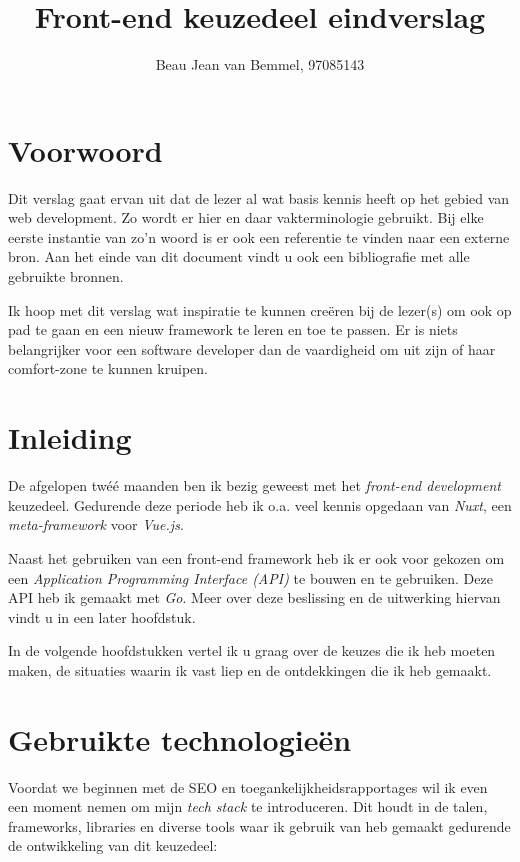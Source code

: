 \documentclass[a4paper]{report}
\title{Front-end keuzedeel eindverslag}
\author{Beau Jean van Bemmel, 97085143}
\begin{document}
    \maketitle

    \chapter*{Voorwoord}
    Dit verslag gaat ervan uit dat de lezer al wat basis kennis heeft op het gebied van web development.
    Zo wordt er hier en daar vakterminologie gebruikt. Bij elke eerste instantie van zo'n woord is er ook een referentie te vinden naar een externe bron.
    Aan het einde van dit document vindt u ook een bibliografie met alle gebruikte bronnen.

    Ik hoop met dit verslag wat inspiratie te kunnen creëren bij de lezer(s) om ook op pad te gaan en een nieuw framework te leren en toe te passen.
    Er is niets belangrijker voor een software developer dan de vaardigheid om uit zijn of haar comfort-zone te kunnen kruipen.
    \tableofcontents

    \chapter{Inleiding}
    De afgelopen twéé maanden ben ik bezig geweest met het \textit{front-end development} keuzedeel.
    Gedurende deze periode heb ik o.a. veel kennis opgedaan van 
    \textit{Nuxt}, een 
    \textit{meta-framework} voor 
    \textit{Vue.js}.
    
    Naast het gebruiken van een front-end framework heb ik er ook voor gekozen om een \textit{Application Programming Interface (API)} te bouwen en te gebruiken.
    Deze API heb ik gemaakt met \textit{Go}. Meer over deze beslissing en de uitwerking hiervan vindt u in een later hoofdstuk.

    In de volgende hoofdstukken vertel ik u graag over de keuzes die ik heb moeten maken, de situaties waarin ik vast liep en de ontdekkingen die ik heb gemaakt.

    \chapter{Gebruikte technologieën}
    Voordat we beginnen met de SEO en toegankelijkheidsrapportages wil ik even een moment nemen om mijn \textit{tech stack} te introduceren.
    Dit houdt in de talen, frameworks, libraries en diverse tools waar ik gebruik van heb gemaakt gedurende de ontwikkeling van dit keuzedeel:
\end{document}
